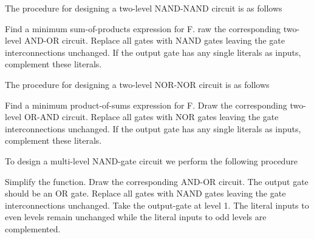 \documentclass{report}
\begin{document}
The procedure for designing a two-level NAND-NAND circuit is as follows

\begin{enumerate}
	\ii Find a minimum sum-of-products expression for F.
	\ii raw the corresponding two-level AND-OR circuit.
	\ii Replace all gates with NAND gates leaving the gate interconnections unchanged.
	\ii If the output gate has any single literals as inputs, complement these literals.
\end{enumerate}

The procedure for designing a two-level NOR-NOR circuit is as follows

\begin{enumerate}
	\ii Find a minimum product-of-sums expression for F.
	\ii Draw the corresponding two-level OR-AND circuit.
	\ii Replace all gates with NOR gates leaving the gate interconnections unchanged.
	\ii If the output gate has any single literals as inputs, complement these literals.
\end{enumerate}

To design a multi-level NAND-gate circuit we perform the following procedure

\begin{enumerate}
	\ii Simplify the function.
	\ii Draw the corresponding AND-OR circuit. The output gate should be an OR gate.
	\ii Replace all gates with NAND gates leaving the gate interconnections unchanged.
	\ii Take the output-gate at level 1. The literal inputs to even levels remain unchanged while the literal inputs to odd levels are complemented.
\end{enumerate}
\end{document}
